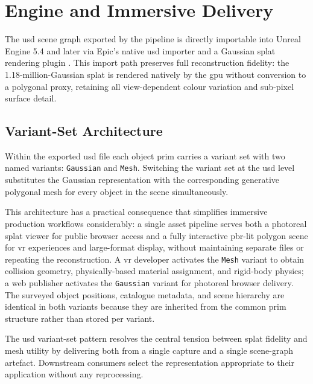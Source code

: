 \section{Engine and Immersive Delivery}
\label{sec:delivery-engine}

The \acrshort{usd} scene graph exported by the pipeline is directly importable into
Unreal Engine 5.4 and later via Epic's native \acrshort{usd} importer and a
Gaussian splat rendering plugin \parencite{Pixar2019}. This import path preserves
full reconstruction fidelity: the 1.18-million-Gaussian splat is rendered natively
by the \acrshort{gpu} without conversion to a polygonal proxy, retaining all
view-dependent colour variation and sub-pixel surface detail.

\subsection{Variant-Set Architecture}

Within the exported \acrshort{usd} file each object prim carries a variant set with
two named variants: \texttt{Gaussian} and \texttt{Mesh}. Switching the variant set
at the \acrshort{usd} level substitutes the Gaussian representation with the
corresponding generative polygonal mesh for every object in the scene simultaneously.

This architecture has a practical consequence that simplifies immersive production
workflows considerably: a single asset pipeline serves both a photoreal splat viewer
for public browser access and a fully interactive \acrshort{pbr}-lit polygon scene
for \acrshort{vr} experiences and large-format display, without maintaining separate
files or repeating the reconstruction. A \acrshort{vr} developer activates the
\texttt{Mesh} variant to obtain collision geometry, physically-based material
assignment, and rigid-body physics; a web publisher activates the
\texttt{Gaussian} variant for photoreal browser delivery. The surveyed object
positions, catalogue metadata, and scene hierarchy are identical in both variants
because they are inherited from the common prim structure rather than stored per
variant.

\begin{keyfinding}
The \acrshort{usd} variant-set pattern resolves the central tension between splat
fidelity and mesh utility by delivering both from a single capture and a single
scene-graph artefact. Downstream consumers select the representation appropriate to
their application without any reprocessing.
\end{keyfinding}

